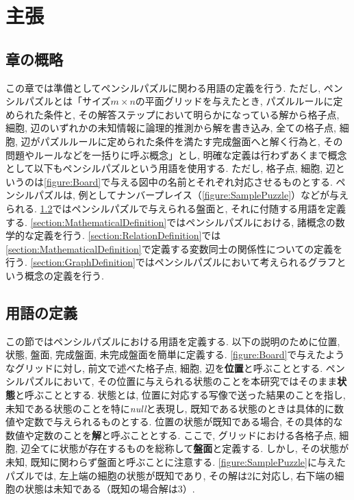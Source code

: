 \chapter{主張}\label{chapter:Prepare}
\section{章の概略}\label{section:Outline}
この章では準備としてペンシルパズルに関わる用語の定義を行う. ただし, ペンシルパズルとは「サイズ$m\times n$の平面グリッドを与えたとき, パズルルールに定められた条件と, その解答ステップにおいて明らかになっている解から格子点, 細胞, 辺のいずれかの未知情報に論理的推測から解を書き込み, 全ての格子点, 細胞, 辺がパズルルールに定められた条件を満たす完成盤面へと解く行為と, その問題やルールなどを一括りに呼ぶ概念」とし, 明確な定義は行わずあくまで概念として以下もペンシルパズルという用語を使用する. ただし, 格子点, 細胞, 辺というのは\cref{figure:Board}で与える図中の名前とそれぞれ対応させるものとする.
ペンシルパズルは, 例としてナンバープレイス（\cref{figure:SamplePuzzle}）などが与えられる.
\cref{section:WordDefinition}ではペンシルパズルで与えられる盤面と, それに付随する用語を定義する.
\cref{section:MathematicalDefinition}ではペンシルパズルにおける, 諸概念の数学的な定義を行う.
\cref{section:RelationDefinition}では\cref{section:MathematicalDefinition}で定義する変数同士の関係性についての定義を行う.
\cref{section:GraphDefinition}ではペンシルパズルにおいて考えられるグラフという概念の定義を行う.

\section{用語の定義}\label{section:WordDefinition}
この節ではペンシルパズルにおける用語を定義する.
以下の説明のために位置, 状態, 盤面, 完成盤面, 未完成盤面を簡単に定義する. \cref{figure:Board}で与えたようなグリッドに対し, 前文で述べた格子点, 細胞, 辺を\textbf{位置}と呼ぶこととする. ペンシルパズルにおいて, その位置に与えられる状態のことを本研究ではそのまま\textbf{状態}と呼ぶこととする. 状態とは, 位置に対応する写像で送った結果のことを指し, 未知である状態のことを特に\textit{null}と表現し, 既知である状態のときは具体的に数値や定数で与えられるものとする. 位置の状態が既知である場合, その具体的な数値や定数のことを\textbf{解}と呼ぶこととする. ここで, グリッドにおける各格子点, 細胞, 辺全てに状態が存在するものを総称して\textbf{盤面}と定義する. しかし, その状態が未知, 既知に関わらず盤面と呼ぶことに注意する. \cref{figure:SamplePuzzle}に与えたパズルでは, 左上端の細胞の状態が既知であり, その解は2に対応し, 右下端の細胞の状態は未知である（既知の場合解は3）.

